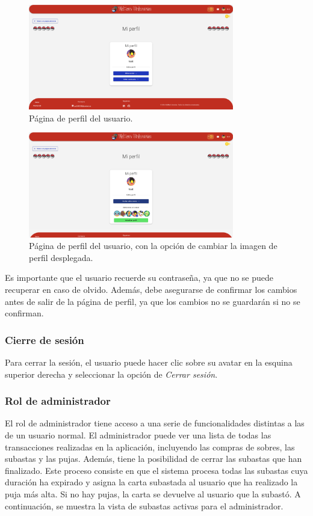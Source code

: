 \begin{figure}[H]
    \centering
    \includegraphics[width=0.8\textwidth]{figures/6-Analisis/6-Interfaz/interfaz/perfil1.png}
    \caption{Página de perfil del usuario.}
    \label{fig:m-interfaz-perfil1}
\end{figure}


\begin{figure}[H]
    \centering
    \includegraphics[width=0.8\textwidth]{figures/6-Analisis/6-Interfaz/interfaz/perfil2.png}
    \caption{Página de perfil del usuario, con la opción de cambiar la imagen de perfil desplegada.}
    \label{fig:m-interfaz-perfil2}
\end{figure}

Es importante que el usuario recuerde su contraseña, ya que no se puede recuperar en caso de olvido.
Además, debe asegurarse de confirmar los cambios antes de salir de la página de perfil, ya que los cambios no se guardarán si no se confirman.

\subsubsection{Cierre de sesión}
Para cerrar la sesión, el usuario puede hacer clic sobre  su avatar en la esquina superior derecha y seleccionar la opción de \textit{Cerrar sesión}.


\subsubsection{Rol de administrador}
El rol de administrador tiene acceso a una serie de funcionalidades distintas a las de un usuario normal.
El administrador puede ver una lista de todas las transacciones realizadas en la aplicación, incluyendo las compras de sobres, las subastas y las pujas.
Además, tiene la posibilidad de cerrar las subastas que han finalizado.
Este proceso consiste en que el sistema procesa todas las subastas cuya duración ha expirado y asigna la carta subastada al usuario que ha realizado la puja más alta.
Si no hay pujas, la carta se devuelve al usuario que la subastó.
A continuación, se muestra la vista de subastas activas para el administrador.

